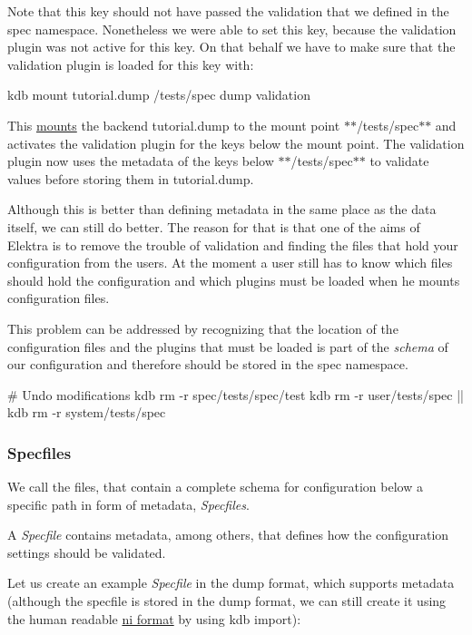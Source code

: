 Note that this key should not have passed the validation that we defined in the spec namespace. Nonetheless we were able to set this key, because the validation plugin was not active for this key. On that behalf we have to make sure that the validation plugin is loaded for this key with\+:


\begin{DoxyCode}
kdb mount tutorial.dump /tests/spec dump validation
\end{DoxyCode}


This \hyperlink{doc_tutorials_mount_md}{mounts} the backend {\ttfamily tutorial.\+dump} to the mount point $\ast$$\ast$/tests/spec$\ast$$\ast$ and activates the validation plugin for the keys below the mount point. The validation plugin now uses the metadata of the keys below $\ast$$\ast$/tests/spec$\ast$$\ast$ to validate values before storing them in {\ttfamily tutorial.\+dump}.

Although this is better than defining metadata in the same place as the data itself, we can still do better. The reason for that is that one of the aims of Elektra is to remove the trouble of validation and finding the files that hold your configuration from the users. At the moment a user still has to know which files should hold the configuration and which plugins must be loaded when he mounts configuration files.

This problem can be addressed by recognizing that the location of the configuration files and the plugins that must be loaded is part of the {\itshape schema} of our configuration and therefore should be stored in the spec namespace.


\begin{DoxyCode}
# Undo modifications
kdb rm -r spec/tests/spec/test
kdb rm -r user/tests/spec || kdb rm -r system/tests/spec
\end{DoxyCode}


\subsubsection*{Specfiles}

We call the files, that contain a complete schema for configuration below a specific path in form of metadata, {\itshape Specfiles}.

A {\itshape Specfile} contains metadata, among others, that defines how the configuration settings should be validated.

Let us create an example {\itshape Specfile} in the dump format, which supports metadata (although the specfile is stored in the dump format, we can still create it using the human readable \hyperlink{md_src_plugins_ni_README_src_plugins_ni_README_md}{ni format} by using {\ttfamily kdb import})\+:


